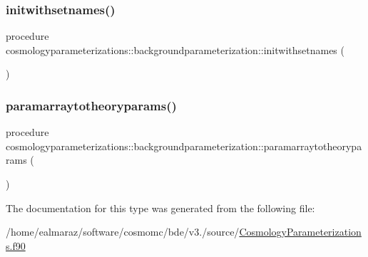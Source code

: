 \subsubsection{\texorpdfstring{initwithsetnames()}{initwithsetnames()}}
{\footnotesize\ttfamily procedure cosmologyparameterizations\+::backgroundparameterization\+::initwithsetnames (\begin{DoxyParamCaption}{ }\end{DoxyParamCaption})\hspace{0.3cm}{\ttfamily [private]}}

\mbox{\label{structcosmologyparameterizations_1_1backgroundparameterization_a0c40db7122e98fdeba557e49ebf16625}} 
\subsubsection{\texorpdfstring{paramarraytotheoryparams()}{paramarraytotheoryparams()}}
{\footnotesize\ttfamily procedure cosmologyparameterizations\+::backgroundparameterization\+::paramarraytotheoryparams (\begin{DoxyParamCaption}{ }\end{DoxyParamCaption})\hspace{0.3cm}{\ttfamily [private]}}



The documentation for this type was generated from the following file\+:\begin{DoxyCompactItemize}
\item 
/home/ealmaraz/software/cosmomc/bde/v3./source/\mbox{\hyperlink{CosmologyParameterizations_8f90}{Cosmology\+Parameterizations.\+f90}}\end{DoxyCompactItemize}
